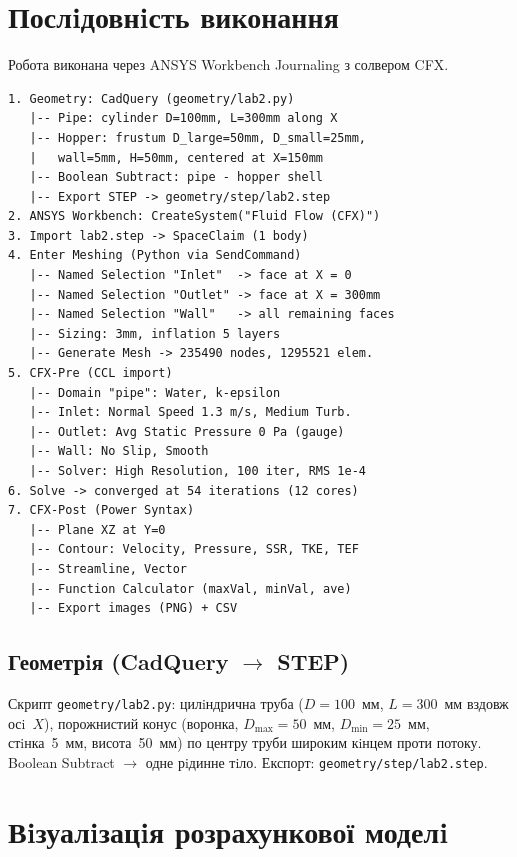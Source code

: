 \section{Послiдовнiсть виконання}

Робота виконана через ANSYS Workbench Journaling з солвером CFX.

\begin{lstlisting}[style=scheme]
1. Geometry: CadQuery (geometry/lab2.py)
   |-- Pipe: cylinder D=100mm, L=300mm along X
   |-- Hopper: frustum D_large=50mm, D_small=25mm,
   |   wall=5mm, H=50mm, centered at X=150mm
   |-- Boolean Subtract: pipe - hopper shell
   |-- Export STEP -> geometry/step/lab2.step
2. ANSYS Workbench: CreateSystem("Fluid Flow (CFX)")
3. Import lab2.step -> SpaceClaim (1 body)
4. Enter Meshing (Python via SendCommand)
   |-- Named Selection "Inlet"  -> face at X = 0
   |-- Named Selection "Outlet" -> face at X = 300mm
   |-- Named Selection "Wall"   -> all remaining faces
   |-- Sizing: 3mm, inflation 5 layers
   |-- Generate Mesh -> 235490 nodes, 1295521 elem.
5. CFX-Pre (CCL import)
   |-- Domain "pipe": Water, k-epsilon
   |-- Inlet: Normal Speed 1.3 m/s, Medium Turb.
   |-- Outlet: Avg Static Pressure 0 Pa (gauge)
   |-- Wall: No Slip, Smooth
   |-- Solver: High Resolution, 100 iter, RMS 1e-4
6. Solve -> converged at 54 iterations (12 cores)
7. CFX-Post (Power Syntax)
   |-- Plane XZ at Y=0
   |-- Contour: Velocity, Pressure, SSR, TKE, TEF
   |-- Streamline, Vector
   |-- Function Calculator (maxVal, minVal, ave)
   |-- Export images (PNG) + CSV
\end{lstlisting}

\subsection{Геометрiя (CadQuery $\to$ STEP)}

Скрипт \texttt{geometry/lab2.py}: цилiндрична труба ($D=100$~мм, $L=300$~мм вздовж осi~$X$), порожнистий конус (воронка, $D_{\max}=50$~мм, $D_{\min}=25$~мм, стiнка~5~мм, висота~50~мм) по центру труби широким кiнцем проти потоку. Boolean Subtract $\to$ одне рiдинне тiло. Експорт: \texttt{geometry/step/lab2.step}.

\section{Вiзуалiзацiя розрахункової моделi}

